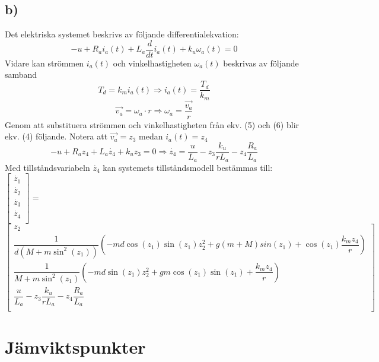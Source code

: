 \documentclass[11pt]{article}
\begin{document}
\subsection{b)}
Det elektriska systemet beskrivs av följande differentialekvation:
\begin{equation}
-u+R_ai_a(t)+L_a\dfrac{d}{dt}i_a(t)+k_u\omega_a(t) =0
\end{equation} Vidare kan strömmen $i_a(t)$ och vinkelhastigheten $\omega_a(t)$ beskrivas av följande samband \begin{equation}
T_d = k_mi_a(t) \Rightarrow i_a(t)=\dfrac{T_d}{k_m}
\end{equation}
\begin{equation}
\overrightarrow{v_a} = \omega_a\cdot r \Rightarrow \omega_a = \dfrac{\overrightarrow{v_a}}{r}
\end{equation}
Genom att substituera strömmen och vinkelhastigheten från ekv. (5) och (6) blir ekv. (4) följande. Notera att $\overrightarrow{v_a} =z_3 $ medan $i_a(t) = z_4$ 
$$
-u+R_az_4+L_a\dot{z_4}+k_uz_3=0 \Rightarrow \dot{z_4}=\dfrac{u}{L_a}-z_3\dfrac{k_u}{rL_a}-z_4\dfrac{R_a}{L_a}
$$
Med tillståndsvariabeln $\dot{z_4}$ kan systemets tillståndsmodell bestämmas till:\\[1.5em]
$
\begin{bmatrix}
\dot{z_1}\\
\dot{z_2}\\
\dot{z_3}\\
\dot{z_4}\\
\end{bmatrix}
$ =$
\begin{bmatrix}
z_2\\
\dfrac{1}{d(M+m\sin^2(z_1))}(-md\cos(z_1)\sin(z_1)z_2^2+g(m+M)sin(z_1)+\cos(z_1)\dfrac{k_mz_4}{r})\\
\dfrac{1}{M+m\sin^2(z_1)}(-md\sin(z_1)z_2^2+gm\cos(z_1)\sin(z_1)+\dfrac{k_mz_4}{r})\\
\dfrac{u}{L_a}-z_3\dfrac{k_u}{rL_a}-z_4\dfrac{R_a}{L_a}\\
\end{bmatrix}
$
\newpage
\section{Jämviktspunkter}
\end{document}
